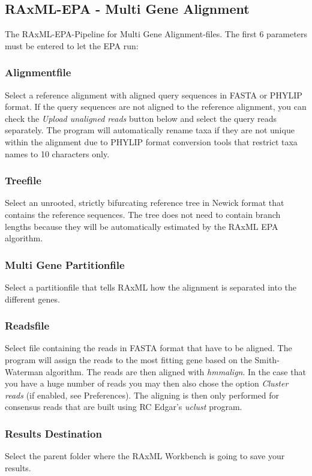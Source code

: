 \documentclass{article}
\begin{document}
	\subsection{RAxML-EPA - Multi Gene Alignment}
		The RAxML-EPA-Pipeline for Multi Gene Alignment-files. The first 6 parameters must be entered to let the EPA run:
		\subsubsection*{Alignmentfile}	
			Select a reference alignment with aligned query sequences in FASTA or PHYLIP format. If the query sequences are not aligned to the reference alignment, you can check the \textit{Upload unaligned reads} button below and select the query reads separately. The program will automatically rename taxa if they are not unique within the alignment due to PHYLIP format conversion tools that restrict taxa names to 10 characters only.
		\subsubsection*{Treefile}
			Select an unrooted, strictly bifurcating reference tree in Newick format that contains the reference sequences. The tree does not need to contain branch lengths because they will be automatically estimated by the RAxML EPA algorithm.
		\subsubsection*{Multi Gene Partitionfile}
		Select a partitionfile that tells RAxML how the alignment is separated into the different genes. 
		\subsubsection*{Readsfile}	
		Select file containing the reads in FASTA format that have to be aligned. The program will assign the reads to the most fitting gene based on the Smith-Waterman algorithm. The reads are then aligned with \textit{hmmalign}. In the case that you have a huge number of reads you may then also chose the option \textit{Cluster reads} (if enabled, see Preferences). The aligning is then only performed for consensus reads that are built using RC Edgar's \textit{uclust} program.
		\subsubsection*{Results Destination}
			Select the parent folder where the RAxML Workbench is going to save your results.
\end{document}
